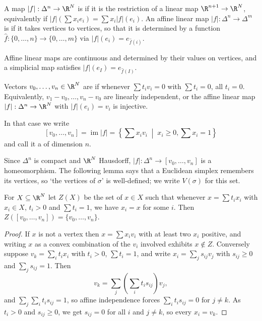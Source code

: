 \begin{definition}
	A map $|f|: \Delta^n \to \R^N$ is  if it is the restriction of a linear map $\R^{n+1}\to\R^N$, equivalently if $|f|(\sum x_ie_i) = \sum x_i |f|(e_i)$. An affine linear map $|f|: \Delta^n \to \Delta^m$ is  if it takes vertices to vertices, so that it is determined by a function $\hat f: \{0,\dots,n\} \to \{0,\dots,m\}$ via $|f|(e_i) = e_{\hat f(i)}$.
\end{definition}

Affine linear maps are continuous and determined by their values on vertices, and a
simplicial map satisfies $|f|(e_I) = e_{\hat f(I)}$.

\begin{definition}
	Vectors $v_0,\dots,v_n \in \R^N$ are  if whenever $\sum t_iv_i = 0$ with $\sum t_i = 0$, all $t_i = 0$. Equivalently, $v_1 - v_0, \dots, v_n - v_0$ are linearly independent, or the affine linear map $|f|: \Delta^n \to \R^N$ with $|f|(e_i) = v_i$ is injective.

	In that case we write
	$$
	[v_0,\dots,v_n] = \operatorname{im}|f| = \left\{\sum x_iv_i \;\middle|\; x_i \geq 0, \sum x_i = 1\right\}
	$$
	and call it a  of dimension $n$.
\end{definition}

Since $\Delta^n$ is compact and $\R^N$ Hausdorff, $|f|: \Delta^n \to [v_0,\dots,v_n]$ is a
homeomorphism. The following lemma says that a Euclidean simplex remembers its vertices,
so `the vertices of $\sigma$' is well-defined; we write $V(\sigma)$ for this set.

\begin{lemma} \label{lem:simplex-vertices}
	For $X \subseteq \R^N$ let $Z(X)$ be the set of $x \in X$ such that whenever $x = \sum t_ix_i$ with $x_i \in X$, $t_i > 0$ and $\sum t_i = 1$, we have $x_i = x$ for some $i$. Then $Z([v_0,\dots,v_n]) = \{v_0,\dots,v_n\}$.
\end{lemma}
\begin{proof}
	If $x$ is not a vertex then $x = \sum x_iv_i$ with at least two $x_i$ positive, and writing $x$ as a convex combination of the $v_i$ involved exhibits $x \notin Z$. Conversely suppose $v_k = \sum_i t_ix_i$ with $t_i > 0$, $\sum t_i = 1$, and write $x_i = \sum_j s_{ij}v_j$ with $s_{ij}\geq 0$ and $\sum_j s_{ij} = 1$. Then
	$$
	v_k = \sum_j \left(\sum_i t_is_{ij}\right)v_j,
	$$
	and $\sum_j\sum_i t_is_{ij} = 1$, so affine independence forces $\sum_i t_is_{ij} = 0$ for $j \neq k$. As $t_i > 0$ and $s_{ij}\geq 0$, we get $s_{ij} = 0$ for all $i$ and $j \neq k$, so every $x_i = v_k$.
\end{proof}

